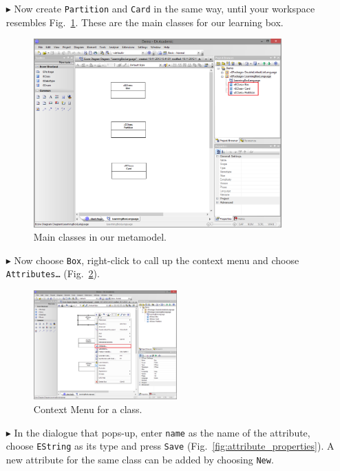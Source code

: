 \begin{enumerate}
\item[$\blacktriangleright$] Now create \texttt{Partition} and \texttt{Card} in the same way, until your workspace resembles Fig.~\ref{fig:all_eclasses}.
These are the main classes for our learning box.

\begin{figure}[htbp]
	\centering
  \includegraphics[width=0.9\textwidth]{pics/memBoxBilder/memBox10.png}
	\caption{Main classes in our metamodel.}
	\label{fig:all_eclasses}
\end{figure}

\item[$\blacktriangleright$] Now choose \texttt{Box}, right-click to call up the context menu and choose \texttt{Att\-ri\-butes\ldots} (Fig.~\ref{fig:attribute}).

\begin{figure}[htbp]
	\centering
  \includegraphics[width=0.52\textwidth]{pics/memBoxBilder/memBox11.png}
	\caption{Context Menu for a class.}
	\label{fig:attribute}
\end{figure}
\FloatBarrier


\item[$\blacktriangleright$] In the dialogue that pops-up, enter \texttt{name} as the name of the attribute, choose \texttt{EString} as its type and press \texttt{Save} (Fig.~\ref{fig:attribute_properties}).
A new attribute for the same class can be added by choosing \texttt{New}.


\end{enumerate}
